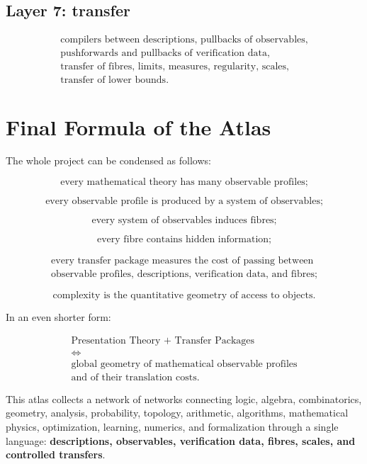 \documentclass[11pt]{article}
\begin{document}
\subsection{Layer 7: transfer}

\[
\begin{gathered}
\text{compilers between descriptions, pullbacks of observables},\\
\text{pushforwards and pullbacks of verification data},\\
\text{transfer of fibres, limits, measures, regularity, scales},\\
\text{transfer of lower bounds}.
\end{gathered}
\]

\section{Final Formula of the Atlas}

The whole project can be condensed as follows:

\[
\boxed{
\text{every mathematical theory has many observable profiles;}
}
\]

\[
\boxed{
\text{every observable profile is produced by a system of observables;}
}
\]

\[
\boxed{
\text{every system of observables induces fibres;}
}
\]

\[
\boxed{
\text{every fibre contains hidden information;}
}
\]

\[
\boxed{
\begin{gathered}
\text{every transfer package measures the cost of passing between}\\
\text{observable profiles, descriptions, verification data, and fibres;}
\end{gathered}
}
\]

\[
\boxed{
\text{complexity is the quantitative geometry of access to objects.}
}
\]

In an even shorter form:

\[
\boxed{
\begin{gathered}
\text{Presentation Theory + Transfer Packages}\\
\Longleftrightarrow\\
\text{global geometry of mathematical observable profiles}\\
\text{and of their translation costs.}
\end{gathered}
}
\]

This atlas collects a network of networks connecting logic, algebra, combinatorics, geometry, analysis, probability, topology, arithmetic, algorithms, mathematical physics, optimization, learning, numerics, and formalization through a single language: \textbf{descriptions, observables, verification data, fibres, scales, and controlled transfers}.
\end{document}
